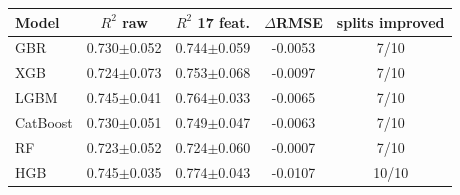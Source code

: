 \begin{tabular}{lcccc}\toprule Model & $R^2$ raw & $R^2$ 17 feat. & $\Delta$RMSE & splits improved\\\midrule
GBR & 0.730$\pm$0.052 & 0.744$\pm$0.059 & -0.0053 & 7/10\\
XGB & 0.724$\pm$0.073 & 0.753$\pm$0.068 & -0.0097 & 7/10\\
LGBM & 0.745$\pm$0.041 & 0.764$\pm$0.033 & -0.0065 & 7/10\\
CatBoost & 0.730$\pm$0.051 & 0.749$\pm$0.047 & -0.0063 & 7/10\\
RF & 0.723$\pm$0.052 & 0.724$\pm$0.060 & -0.0007 & 7/10\\
HGB & 0.745$\pm$0.035 & 0.774$\pm$0.043 & -0.0107 & 10/10\\
\bottomrule\end{tabular}